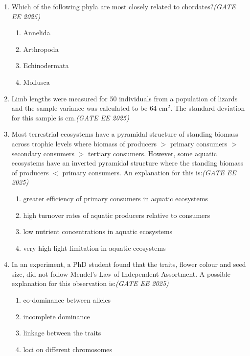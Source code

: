 \begin{enumerate}[leftmargin=*,label=\textbf{Q.\arabic*}]
\item Which of the following phyla are most closely related to chordates?\hfill \textit{(GATE EE 2025)}
\begin{multicols}{2}
\begin{enumerate}[label=(\Alph*)]
\item Annelida
\item Arthropoda
\item Echinodermata
\item Mollusca
\end{enumerate}
\end{multicols}

\item Limb lengths were measured for 50 individuals from a population of lizards and the sample variance was calculated to be 64 cm$^2$. The standard deviation for this sample is \underline{\hspace{2cm}} cm.\hfill \textit{(GATE EE 2025)}
\item Most terrestrial ecosystems have a pyramidal structure of standing biomass across trophic levels where biomass of producers $>$ primary consumers $>$ secondary consumers $>$ tertiary consumers. However, some aquatic ecosystems have an inverted pyramidal structure where the standing biomass of producers $<$ primary consumers. An explanation for this is:\hfill \textit{(GATE EE 2025)}
\begin{multicols}{2}
\begin{enumerate}[label=(\Alph*)]
\item greater efficiency of primary consumers in aquatic ecosystems
\item high turnover rates of aquatic producers relative to consumers
\item low nutrient concentrations in aquatic ecosystems
\item very high light limitation in aquatic ecosystems
\end{enumerate}
\end{multicols}

\item In an experiment, a PhD student found that the traits, flower colour and seed size, did not follow Mendel’s Law of Independent Assortment. A possible explanation for this observation is:\hfill \textit{(GATE EE 2025)}
\begin{multicols}{2}
\begin{enumerate}[label=(\Alph*)]
\item co-dominance between alleles
\item incomplete dominance
\item linkage between the traits
\item loci on different chromosomes
\end{enumerate}
\end{multicols}


\end{enumerate}
